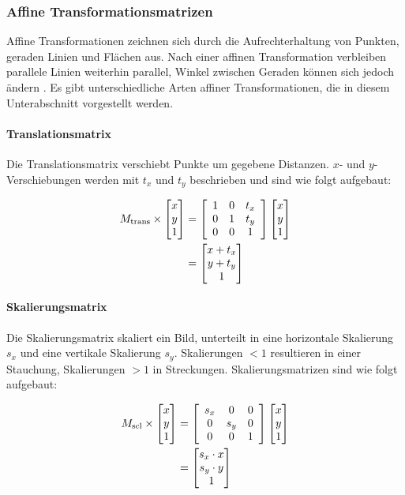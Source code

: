 \newpage
\subsubsection{Affine Transformationsmatrizen}
\label{sec:affine_transformations_matrizen}

Affine Transformationen zeichnen sich durch die Aufrechterhaltung von Punkten, geraden Linien und Flächen aus. Nach einer affinen Transformation verbleiben parallele Linien weiterhin parallel, Winkel zwischen Geraden können sich jedoch ändern \cite{cv_general}. Es gibt unterschiedliche Arten affiner Transformationen, die in diesem Unterabschnitt vorgestellt werden.

\paragraph{Translationsmatrix}
\label{par:translation}

Die Translationsmatrix verschiebt Punkte um gegebene Distanzen. $x$- und $y$-Verschiebungen werden mit $t_x$ und $t_y$ beschrieben und sind wie folgt aufgebaut:

{\setlength{\belowdisplayskip}{0.5ex}
\begin{align*}
    M_\text{trans} \times \begin{bmatrix} x \\ y \\ 1 \end{bmatrix}
     & =
    \left[
        \begin{array}{ccc}
            1 & 0 & t_x \\
            0 & 1 & t_y \\
            0 & 0 & 1   \\
        \end{array}
        \right]
    \begin{bmatrix} x \\ y \\ 1 \end{bmatrix} \\
     & =
    \begin{bmatrix} x + t_x \\ y + t_y \\ 1 \end{bmatrix}
\end{align*}}

\paragraph{Skalierungsmatrix}
\label{par:skalierung}

Die Skalierungsmatrix skaliert ein Bild, unterteilt in eine horizontale Skalierung $s_x$ und eine vertikale Skalierung $s_y$. Skalierungen $<1$ resultieren in einer Stauchung, Skalierungen $>1$ in Streckungen. Skalierungsmatrizen sind wie folgt aufgebaut:

{\setlength{\belowdisplayskip}{0.5ex}
\begin{align*}
    M_\text{scl} \times \begin{bmatrix} x \\ y \\ 1 \end{bmatrix}
     & =
    \left[
        \begin{array}{ccc}
            s_x & 0   & 0 \\
            0   & s_y & 0 \\
            0   & 0   & 1 \\
        \end{array}
        \right]
    \begin{bmatrix} x \\ y \\ 1 \end{bmatrix} \\
     & =
    \begin{bmatrix} s_x \cdot x \\ s_y \cdot y \\ 1 \end{bmatrix}
\end{align*}}

